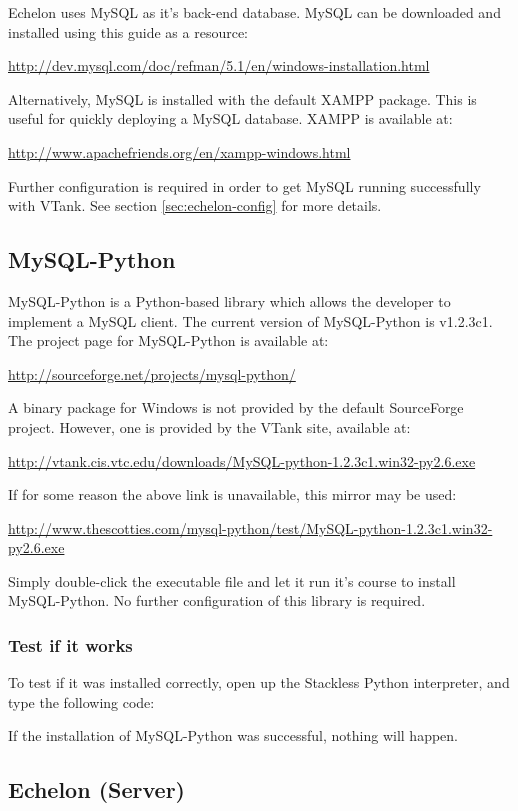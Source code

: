 Echelon uses MySQL as it's back-end database. MySQL can be downloaded and installed using this guide as a resource:

\url{http://dev.mysql.com/doc/refman/5.1/en/windows-installation.html}

Alternatively, MySQL is installed with the default XAMPP package. This is useful for quickly deploying a MySQL database. XAMPP is available at:

\url{http://www.apachefriends.org/en/xampp-windows.html}

Further configuration is required in order to get MySQL running successfully with VTank. See section \ref{sec:echelon-config} for more details.

\subsection{MySQL-Python}

MySQL-Python is a Python-based library which allows the developer to implement a MySQL client. The current version of MySQL-Python is v1.2.3c1. The project page for MySQL-Python is available at:

\url{http://sourceforge.net/projects/mysql-python/}

A binary package for Windows is not provided by the default SourceForge project. However, one is provided by the VTank site, available at:

\url{http://vtank.cis.vtc.edu/downloads/MySQL-python-1.2.3c1.win32-py2.6.exe}

If for some reason the above link is unavailable, this mirror may be used:

\url{http://www.thescotties.com/mysql-python/test/MySQL-python-1.2.3c1.win32-py2.6.exe}

Simply double-click the executable file and let it run it's course to install MySQL-Python. No further configuration of this library is required.

\subsubsection*{Test if it works}

To test if it was installed correctly, open up the Stackless Python interpreter, and type the following code:


If the installation of MySQL-Python was successful, nothing will happen.

\subsection{Echelon (Server)}


